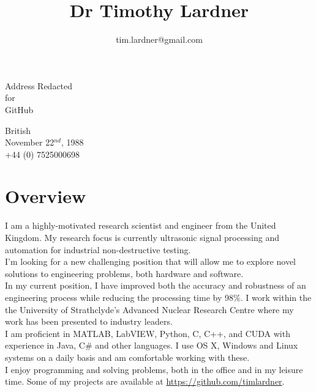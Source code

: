 \documentclass[12pt]{article}
\title{\bfseries\Huge Dr Timothy Lardner}
\author{tim.lardner@gmail.com}
\date{}
\let\stdsection\section
\begin{document}
\maketitle
\vspace{2em}
\begin{minipage}[ht]{0.48\textwidth}
\centering
Address Redacted\\
for\\
GitHub
\end{minipage}
\begin{minipage}[ht]{0.48\textwidth}
\centering
British\\
November 22$^{nd}$, 1988\\
+44 (0) 7525000698
\end{minipage}
\vspace{2em}
\section*{Overview}
I am a highly-motivated research scientist and engineer from the United Kingdom. My research focus is currently ultrasonic signal processing and automation for industrial non-destructive testing.\\[5pt]

I'm looking for a new challenging position that will allow me to explore novel solutions to engineering problems, both hardware and software.\\[5pt]

In my current position, I have improved both the accuracy and robustness of an engineering process while reducing the processing time by 98\%. I work within the the University of Strathclyde's Advanced Nuclear Research Centre where my work has been presented to industry leaders.\\[5pt]

I am proficient in MATLAB, LabVIEW, Python, C, C++, and CUDA with experience in Java, C\# and other languages. I use OS X, Windows and Linux systems on a daily basis and am comfortable working with these.\\[5pt]

I enjoy programming and solving problems, both in the office and in my leisure time. Some of my projects are available at \url{https://github.com/timlardner}.


\renewcommand\section{\newpage\stdsection}
\end{document}
